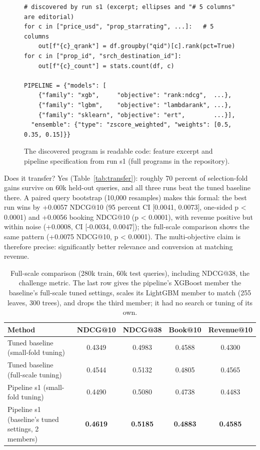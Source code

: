 \documentclass[]{ceurart}
\begin{document}
\begin{figure}
\footnotesize
\begin{verbatim}
# discovered by run s1 (excerpt; ellipses and "# 5 columns" are editorial)
for c in ["price_usd", "prop_starrating", ...]:   # 5 columns
    out[f"{c}_qrank"] = df.groupby("qid")[c].rank(pct=True)
for c in ["prop_id", "srch_destination_id"]:
    out[f"{c}_count"] = stats.count(df, c)

PIPELINE = {"models": [
    {"family": "xgb",     "objective": "rank:ndcg",  ...},
    {"family": "lgbm",    "objective": "lambdarank", ...},
    {"family": "sklearn", "objective": "ert",        ...}],
  "ensemble": {"type": "zscore_weighted", "weights": [0.5, 0.35, 0.15]}}
\end{verbatim}
\caption{The discovered program is readable code: feature excerpt and
pipeline specification from run s1 (full programs in the repository).}
\label{fig:discovered}
\end{figure}

Does it transfer? Yes (Table~\ref{tab:transfer}): roughly 70 percent of
selection-fold gains survive on 60k held-out queries, and all three runs
beat the tuned baseline there. A paired query bootstrap (10,000 resamples) makes
this formal: the best run wins by +0.0057 NDCG@10 (95 percent CI [0.0041,
0.0073], one-sided p < 0.0001) and +0.0056 booking NDCG@10 (p < 0.0001),
with revenue positive but within noise (+0.0008, CI [-0.0034, 0.0047]); the
full-scale comparison shows the same pattern (+0.0075 NDCG@10, p < 0.0001).
The multi-objective claim is therefore precise: significantly better
relevance and conversion at matching revenue.

\begin{table}
  \caption{Full-scale comparison (280k train, 60k test queries), including
  NDCG@38, the challenge metric. The last row gives the pipeline's XGBoost
  member the baseline's full-scale tuned settings, scales its LightGBM
  member to match (255 leaves, 300 trees), and drops the third member; it
  had no search or tuning of its own.}
  \label{tab:fullscale}
  \begin{tabular}{lcccc}
    \toprule
    Method & NDCG@10 & NDCG@38 & Book@10 & Revenue@10 \\
    \midrule
    Tuned baseline (small-fold tuning) & 0.4349 & 0.4983 & 0.4588 & 0.4300 \\
    Tuned baseline (full-scale tuning) & 0.4544 & 0.5132 & 0.4805 & 0.4565 \\
    Pipeline s1 (small-fold tuning) & 0.4490 & 0.5080 & 0.4738 & 0.4483 \\
    Pipeline s1 (baseline's tuned settings, 2 members) & \textbf{0.4619} & \textbf{0.5185} & \textbf{0.4883} & \textbf{0.4585} \\
    \bottomrule
  \end{tabular}
\end{table}
\end{document}
